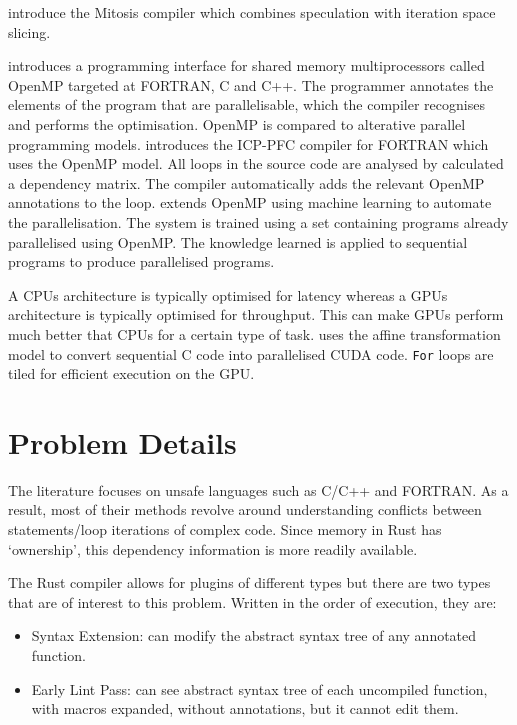 \documentclass[conference]{IEEEtran}
\begin{document}
\textcite{Quinones2005} introduce the Mitosis compiler which combines speculation with iteration space slicing. 

\textcite{Dagum1998} introduces a programming interface for shared memory multiprocessors called OpenMP targeted at FORTRAN, C and C++. The programmer annotates the elements of the program that are parallelisable, which the compiler recognises and performs the optimisation. OpenMP is compared to alterative parallel programming models.
\textcite{Kim2000} introduces the ICP-PFC compiler for FORTRAN which uses the OpenMP model. All loops in the source code are analysed by calculated a dependency matrix. The compiler automatically adds the relevant OpenMP annotations to the loop.
\textcite{Lam2011} extends OpenMP using machine learning to automate the parallelisation. The system is trained using a set containing programs already parallelised using OpenMP. The knowledge learned is applied to sequential programs to produce parallelised programs.

A CPUs architecture is typically optimised for latency whereas a GPUs architecture is typically optimised for throughput. This can make GPUs perform much better that CPUs for a certain type of task. \textcite{Baskaran2010} uses the affine transformation model to convert sequential C code into parallelised CUDA code. \texttt{For} loops are tiled for efficient execution on the GPU.

\newpage
\section{Problem Details}
\label{sec:problem-details}
The literature focuses on unsafe languages such as C/C++ and FORTRAN. As a result, most of their methods revolve around understanding conflicts between statements/loop iterations of complex code. Since memory in Rust has `ownership', this dependency information is more readily available.

The Rust compiler allows for plugins of different types but there are two types that are of interest to this problem. Written in the order of execution, they are:
\begin{itemize}
    \item Syntax Extension: can modify the abstract syntax tree of any annotated function.
    \item Early Lint Pass: can see abstract syntax tree of each uncompiled function, with macros expanded, without annotations, but it cannot edit them.
\end{itemize}
\end{document}

